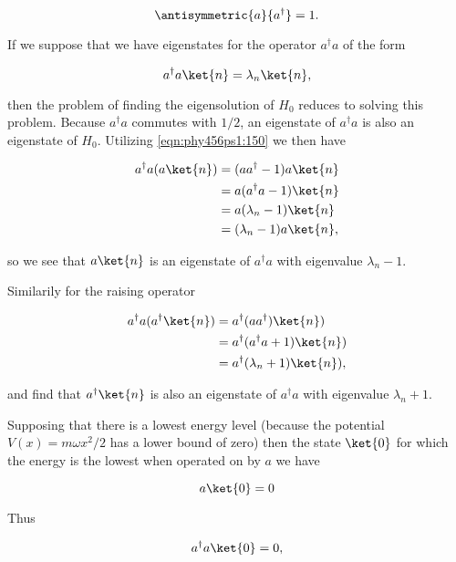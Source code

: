 \begin{equation}\label{eqn:phy456ps1:150}
\antisymmetric{a}{a^\dagger} = 1.
\end{equation}

If we suppose that we have eigenstates for the operator $a^\dagger a$ of the form

\begin{equation}\label{eqn:phy456ps1:200}
a^\dagger a \ket{n} = \lambda_n \ket{n},
\end{equation}

then the problem of finding the eigensolution of $H_0$ reduces to solving this problem.  Because $a^\dagger a$ commutes with $1/2$, an eigenstate of $a^\dagger a$ is also an eigenstate of $H_0$.  Utilizing \ref{eqn:phy456ps1:150} we then have

\begin{align*}
a^\dagger a ( a \ket{n} )
&= (a a^\dagger - 1 ) a \ket{n} \\
&= a (a^\dagger a - 1 ) \ket{n} \\
&= a (\lambda_n - 1 ) \ket{n} \\
&= (\lambda_n - 1 ) a \ket{n},
\end{align*}

so we see that $a \ket{n}$ is an eigenstate of $a^\dagger a$ with eigenvalue $\lambda_n - 1$.

Similarily for the raising operator

\begin{align*}
a^\dagger a ( a^\dagger \ket{n} )
&=
a^\dagger (a  a^\dagger) \ket{n} ) \\
&=
a^\dagger (a^\dagger a + 1) \ket{n} ) \\
&=
a^\dagger (\lambda_n + 1) \ket{n} ),
\end{align*}

and find that $a^\dagger \ket{n}$ is also an eigenstate of $a^\dagger a$ with eigenvalue $\lambda_n + 1$.

Supposing that there is a lowest energy level (because the potential $V(x) = m \omega x^2 /2$ has a lower bound of zero) then the state $\ket{0}$ for which the energy is the lowest when operated on by $a$ we have

\begin{equation}\label{eqn:phy456ps1:220}
a \ket{0} = 0
\end{equation}

Thus

\begin{equation}\label{eqn:phy456ps1:240}
a^\dagger a \ket{0} = 0,
\end{equation}

